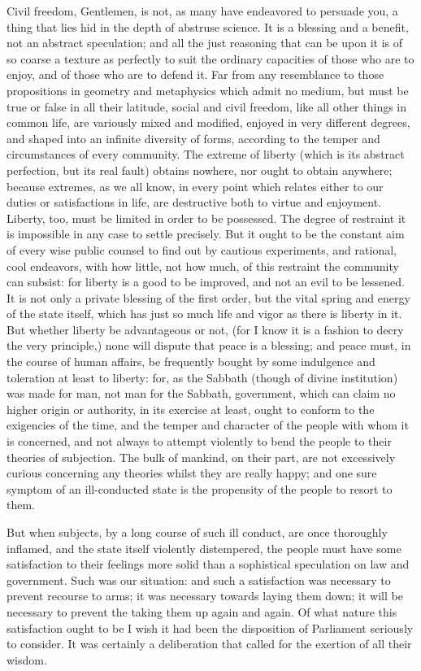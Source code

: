 Civil freedom, Gentlemen, is not, as many have endeavored to persuade you, a thing that lies hid in the depth of abstruse science. It is a blessing and a benefit, not an abstract speculation; and all the just reasoning that can be upon it is of so coarse a texture as perfectly to suit the ordinary capacities of those who are to enjoy, and of those who are to defend it. Far from any resemblance to those propositions in geometry and metaphysics which admit no medium, but must be true or false in all their latitude, social and civil freedom, like all other things in common life, are variously mixed and modified, enjoyed in very different degrees, and shaped into an infinite diversity of forms, according to the temper and circumstances of every community. The extreme of liberty (which is its abstract perfection, but its real fault) obtains nowhere, nor ought to obtain anywhere; because extremes, as we all know, in every point which relates either to our duties or satisfactions in life, are destructive both to virtue and enjoyment. Liberty, too, must be limited in order to be possessed. The degree of restraint it is impossible in any case to settle precisely. But it ought to be the constant aim of every wise public counsel to find out by cautious experiments, and rational, cool endeavors, with how little, not how much, of this restraint the community can subsist: for liberty is a good to be improved, and not an evil to be lessened. It is not only a private blessing of the first order, but the vital spring and energy of the state itself, which has just so much life and vigor as there is liberty in it. But whether liberty be advantageous or not, (for I know it is a fashion to decry the very principle,) none will dispute that peace is a blessing; and peace must, in the course of human affairs, be frequently bought by some indulgence and toleration at least to liberty: for, as the Sabbath (though of divine institution) was made for man, not man for the Sabbath, government, which can claim no higher origin or authority, in its exercise at least, ought to conform to the exigencies of the time, and the temper and character of the people with whom it is concerned, and not always to attempt violently to bend the people to their theories of subjection. The bulk of mankind, on their part, are not excessively curious concerning any theories whilst they are really happy; and one sure symptom of an ill-conducted state is the propensity of the people to resort to them.

But when subjects, by a long course of such ill conduct, are once thoroughly inflamed, and the state itself violently distempered, the people must have some satisfaction to their feelings more solid than a sophistical speculation on law and government. Such was our situation: and such a satisfaction was necessary to prevent recourse to arms; it was necessary towards laying them down; it will be necessary to prevent the taking them up again and again. Of what nature this satisfaction ought to be I wish it had been the disposition of Parliament seriously to consider. It was certainly a deliberation that called for the exertion of all their wisdom.

